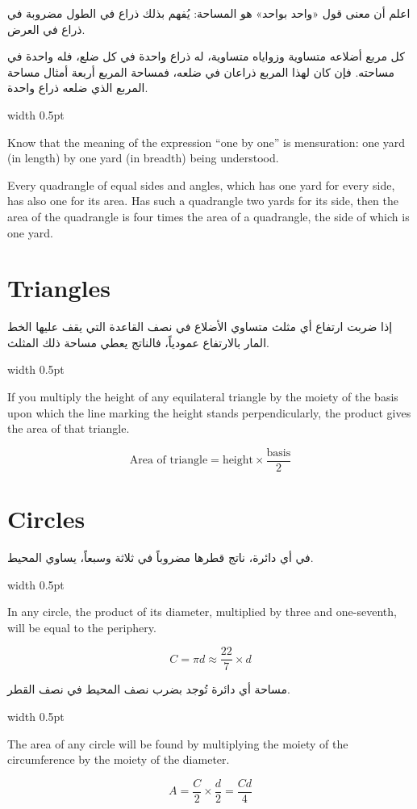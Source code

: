 \documentclass[10pt,a4paper]{book}
\newlength{\colwidth}
\newcommand{\bilingualpair}[2]{%
  \noindent
  \begin{minipage}[t]{\colwidth}
  \begin{flushright}
  \vspace{0pt}
  {\arabicfont\small #1}
  \end{flushright}
  \end{minipage}%
  \hfill\textcolor{columnsepclr}{\vrule width 0.5pt}\hfill
  \begin{minipage}[t]{\colwidth}
  \vspace{0pt}
  {\small #2}
  \end{minipage}%
  \par\vspace{0.6em}
}
\begin{document}
\bilingualpair{
اعلم أن معنى قول «واحد بواحد» هو المساحة: يُفهم بذلك ذراع
في الطول مضروبة في ذراع في العرض.

كل مربع أضلاعه متساوية وزواياه متساوية، له ذراع واحدة في كل
ضلع، فله واحدة في مساحته. فإن كان لهذا المربع ذراعان في
ضلعه، فمساحة المربع أربعة أمثال مساحة المربع الذي ضلعه
ذراع واحدة.
}{
Know that the meaning of the expression ``one by one'' is mensuration: one
yard (in length) by one yard (in breadth) being understood.

Every quadrangle of equal sides and angles, which has one yard for every
side, has also one for its area. Has such a quadrangle two yards for its
side, then the area of the quadrangle is four times the area of a quadrangle,
the side of which is one yard.
}

\section*{Triangles}

\bilingualpair{
إذا ضربت ارتفاع أي مثلث متساوي الأضلاع في نصف القاعدة التي
يقف عليها الخط المار بالارتفاع عمودياً، فالناتج يعطي مساحة
ذلك المثلث.
}{
If you multiply the height of any equilateral triangle by the moiety of the
basis upon which the line marking the height stands perpendicularly, the
product gives the area of that triangle.

\begin{equation}
\text{Area of triangle} = \text{height} \times \frac{\text{basis}}{2}
\end{equation}
}

\section*{Circles}

\bilingualpair{
في أي دائرة، ناتج قطرها مضروباً في ثلاثة وسبعاً، يساوي
المحيط.
}{
In any circle, the product of its diameter, multiplied by three and
one-seventh, will be equal to the periphery.

\begin{equation}
C = \pi d \approx \frac{22}{7} \times d
\end{equation}
}

\bilingualpair{
مساحة أي دائرة تُوجد بضرب نصف المحيط في نصف القطر.
}{
The area of any circle will be found by multiplying the moiety of the
circumference by the moiety of the diameter.

\begin{equation}
A = \frac{C}{2} \times \frac{d}{2} = \frac{Cd}{4}
\end{equation}
}
\end{document}
